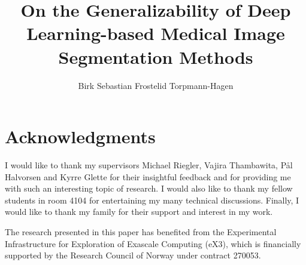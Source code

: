 \documentclass[UKenglish]{ifimaster}  %
\title{On the Generalizability of Deep Learning-based Medical Image Segmentation Methods}        %
\subtitle{}         %
\author{Birk Sebastian Frostelid Torpmann-Hagen}                      %
\begin{document}
    \duoforside[dept={Department of Informatics},   %
        program={Robotics and Intelligent Systems},  %
        long]                                        %

    \frontmatter{}
    
    \tableofcontents{}
    \listoffigures{}
    \listoftables{}

    \chapter*{Acknowledgments}

    I would like to thank my supervisors Michael Riegler, Vajira Thambawita, Pål Halvorsen and Kyrre Glette for their insightful feedback and for providing me with such an interesting topic of research. I would also like to thank my fellow students in room 4104 for entertaining my many technical discussions. Finally, I would like to thank my family for their support and interest in my work.
    
    The research presented in this paper has benefited from the Experimental Infrastructure for Exploration of Exascale Computing (eX3), which is financially supported by the Research Council of Norway under contract 270053.
    \mainmatter{}   
    
    
    
    
    
    
    
    \backmatter{}
    \printbibliography
    
\end{document}

